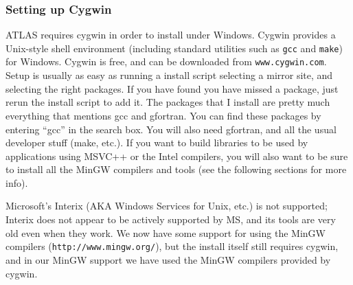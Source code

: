 \documentclass[11pt]{article}
\begin{document}
\subsubsection{Setting up Cygwin}
ATLAS requires cygwin in order to install under Windows.  Cygwin
provides a Unix-style shell environment (including standard utilities such as
{\tt gcc} and {\tt make}) for Windows.
Cygwin is free, and can be downloaded from {\tt www.cygwin.com}.  
Setup is usually as easy as running a install script selecting a mirror
site, and selecting the right packages.  If you have found you have
missed a package, just rerun the install script to add it.  The packages
that I install are pretty much everything that mentions gcc and gfortran.
You can find these packages by entering ``gcc'' in the search box.  
You will also need gfortran, and all the usual developer stuff (make, etc.).
If you want to build libraries to be used by applications using MSVC++
or the Intel compilers, you will also want to be sure to install all the
MinGW compilers and tools (see the following sections for more info).

Microsoft's Interix (AKA Windows Services for Unix, etc.) is not supported;
Interix does not appear to be actively supported by MS, and its tools
are very old even when they work.  We now have some support for using
the MinGW compilers (\verb|http://www.mingw.org/|), but the install itself
still requires cygwin, and in our MinGW support we have used the MinGW 
compilers provided by cygwin.
\end{document}
